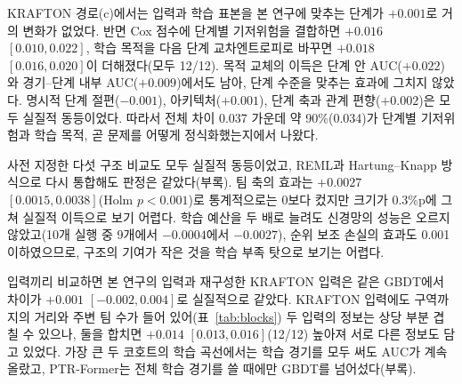 KRAFTON 경로(c)에서는 입력과 학습 표본을 본 연구에 맞추는 단계가 $+0.001$로 거의 변화가 없었다.
반면 Cox 점수에 단계별 기저위험을 결합하면 $+0.016$ $[0.010, 0.022]$, 학습 목적을 다음 단계 교차엔트로피로 바꾸면 $+0.018$ $[0.016, 0.020]$이 더해졌다(모두 12/12).
목적 교체의 이득은 단계 안 AUC($+0.022$)와 경기--단계 내부 AUC($+0.009$)에서도 남아, 단계 수준을 맞추는 효과에 그치지 않았다.
명시적 단계 절편($-0.001$), 아키텍처($+0.001$), 단계 축과 관계 편향($+0.002$)은 모두 실질적 동등이었다.
따라서 전체 차이 0.037 가운데 약 90\%(0.034)가 단계별 기저위험과 학습 목적, 곧 문제를 어떻게 정식화했는지에서 나왔다.

사전 지정한 다섯 구조 비교도 모두 실질적 동등이었고, REML과 Hartung--Knapp 방식으로 다시 통합해도 판정은 같았다(부록).
팀 축의 효과는 $+0.0027$ $[0.0015, 0.0038]$(Holm $p<0.001$)로 통계적으로는 0보다 컸지만 크기가 0.3\%p에 그쳐 실질적 이득으로 보기 어렵다.
학습 예산을 두 배로 늘려도 신경망의 성능은 오르지 않았고(10개 실행 중 9개에서 $-0.0004$에서 $-0.0027$), 순위 보조 손실의 효과도 0.001 이하였으므로, 구조의 기여가 작은 것을 학습 부족 탓으로 보기는 어렵다.

입력끼리 비교하면 본 연구의 입력과 재구성한 KRAFTON 입력은 같은 GBDT에서 차이가 $+0.001$ $[-0.002, 0.004]$로 실질적으로 같았다.
KRAFTON 입력에도 구역까지의 거리와 주변 팀 수가 들어 있어(표~\ref{tab:blocks}) 두 입력의 정보는 상당 부분 겹칠 수 있으나, 둘을 합치면 $+0.014$ $[0.013, 0.016]$(12/12) 높아져 서로 다른 정보도 담고 있었다.
가장 큰 두 코호트의 학습 곡선에서는 학습 경기를 모두 써도 AUC가 계속 올랐고, PTR-Former는 전체 학습 경기를 쓸 때에만 GBDT를 넘어섰다(부록).
